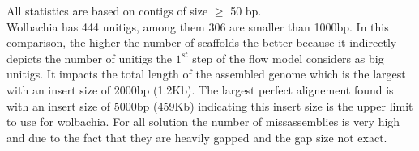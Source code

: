 \documentclass[12pt]{article}
\begin{document}
\begin{table}[ht]
\footnotesize All statistics are based on contigs of size $\geq$ 50 bp. \\
Wolbachia has 444 unitigs, among them 306 are smaller than 1000bp. In this comparison, the higher the number of scaffolds the better because it indirectly depicts the number of unitigs the $1^{st}$ step of the flow model considers as big unitigs. It impacts the total length of the assembled genome which is the largest with an insert size of 2000bp (1.2Kb). The largest perfect alignement found is with an insert size of 5000bp (459Kb) indicating this insert size is the upper limit to use for wolbachia. For all solution the number of missassemblies is very high and due to the fact that they are heavily gapped and the gap size not exact. 
\label{tab:insert}
\end{table}
\end{document}
